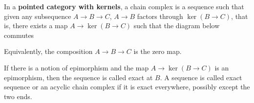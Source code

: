\documentclass{article}
\begin{document}
\begin{definition}
    In a \textbf{pointed category with kernels}, a chain complex is a sequence such that given any subsequence $A \to B \to C$, $A \to B$ factors through $\ker (B \to C)$, that is, there exists a map $A \to \ker (B \to C)$ such that the diagram below commutes
    \begin{center}
    \end{center}

    Equivalently, the composition $A \to B \to C$ is the zero map.

    If there is a notion of epimorphism and the map $A \to \ker (B \to C)$ is an epimorphism, then the sequence is called exact at $B$. A sequence is called exact sequence or an acyclic chain complex if it is exact everywhere, possibly except the two ends.
\end{definition}
\end{document}

